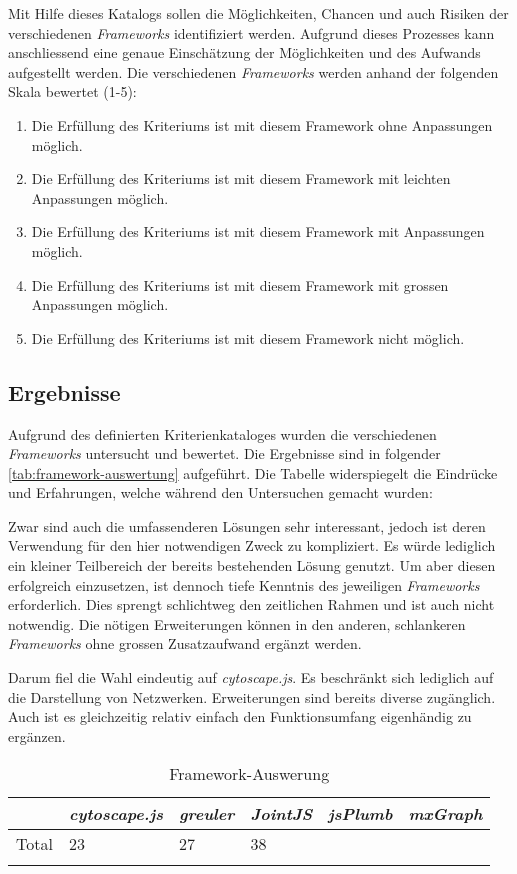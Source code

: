 Mit Hilfe dieses Katalogs sollen die Möglichkeiten, Chancen und auch Risiken der verschiedenen \textit{Frameworks} identifiziert werden. Aufgrund dieses Prozesses kann anschliessend eine genaue Einschätzung der Möglichkeiten und des Aufwands aufgestellt werden. Die verschiedenen  \textit{Frameworks} werden anhand der folgenden Skala bewertet (1-5): 
\begin{enumerate}
  \item Die Erfüllung des Kriteriums ist mit diesem Framework ohne Anpassungen möglich.
  \item Die Erfüllung des Kriteriums ist mit diesem Framework mit leichten Anpassungen möglich.
  \item Die Erfüllung des Kriteriums ist mit diesem Framework mit Anpassungen möglich.
  \item Die Erfüllung des Kriteriums ist mit diesem Framework mit grossen Anpassungen möglich.
  \item Die Erfüllung des Kriteriums ist mit diesem Framework nicht möglich.
\end{enumerate}

\subsection{Ergebnisse}
Aufgrund des definierten Kriterienkataloges wurden die verschiedenen \textit{Frameworks} untersucht und bewertet. Die Ergebnisse sind in folgender \autoref{tab:framework-auswertung} aufgeführt. Die Tabelle widerspiegelt die Eindrücke und Erfahrungen, welche während den Untersuchen gemacht wurden:

Zwar sind auch die umfassenderen Lösungen sehr interessant, jedoch ist deren Verwendung für den hier notwendigen Zweck zu kompliziert. Es würde lediglich ein kleiner Teilbereich der bereits bestehenden Lösung genutzt. Um aber diesen erfolgreich einzusetzen, ist dennoch tiefe Kenntnis des jeweiligen \textit{Frameworks} erforderlich. Dies sprengt schlichtweg den zeitlichen Rahmen und ist auch nicht notwendig. Die nötigen Erweiterungen können in den anderen, schlankeren \textit{Frameworks} ohne grossen Zusatzaufwand ergänzt werden.

Darum fiel die Wahl eindeutig auf \textit{cytoscape.js}. Es beschränkt sich lediglich auf die Darstellung von Netzwerken. Erweiterungen sind bereits diverse zugänglich. Auch ist es gleichzeitig relativ einfach den Funktionsumfang eigenhändig zu ergänzen.

\begin{longtable}{|p{0.8cm}| p{2.2cm} | p{1.5cm}| p{1.5cm}| p{2cm}| p{2cm}|}
  \hline
    & \textit{cytoscape.js} & \textit{greuler} &\textit{JointJS} &\textit{jsPlumb} &\textit{mxGraph}  \\\hline
    Total & 23 & 27 & 38 & &\\\hline
    \caption{Framework-Auswerung}
  \label{tab:framework-auswertung}
\end{longtable}

